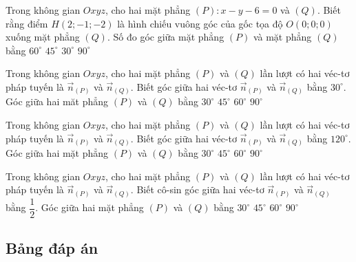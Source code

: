 \begin{ex}%
	Trong không gian $Oxyz$, cho hai mặt phẳng $(P)\colon x-y-6=0$ và $(Q)$. Biết rằng điểm $H(2;-1;-2)$ là hình chiếu vuông góc của gốc tọa độ $O(0;0;0)$ xuống mặt phẳng $(Q)$. Số đo góc giữa mặt phẳng $(P)$ và mặt phẳng $(Q)$ bằng
	\choice
	{$60^{\circ}$}
	{\True $45^{\circ}$}
	{$30^{\circ}$}
	{$90^{\circ}$}
\end{ex}

\begin{ex}%
	Trong không gian $Oxyz$, cho hai mặt phẳng $(P)$ và $(Q)$ lần lượt có hai véc-tơ pháp tuyến là $\overrightarrow{n}_{(P)}$ và $\overrightarrow{n}_{(Q)}$. Biết góc giữa hai véc-tơ $\overrightarrow{n}_{(P)}$ và $\overrightarrow{n}_{(Q)}$ bằng $30^{\circ}$. Góc giữa hai măt phẳng $(P)$ và $(Q)$ bằng
	\choice
	{\True $30^{\circ}$}
	{$45^{\circ}$}
	{$60^{\circ}$}
	{$90^{\circ}$}
\end{ex}

\begin{ex}%
	Trong không gian $Oxyz$, cho hai mặt phẳng $(P)$ và $(Q)$ lần lượt có hai véc-tơ pháp tuyến là $\overrightarrow{n}_{(P)}$ và $\overrightarrow{n}_{(Q)}$. Biết góc giữa hai véc-tơ $\overrightarrow{n}_{(P)}$ và $\overrightarrow{n}_{(Q)}$ bằng $120^{\circ}$. Góc giữa hai mặt phẳng $(P)$ và $(Q)$ bằng
	\choice
	{$30^{\circ}$}
	{$45^{\circ}$}
	{\True $60^{\circ}$}
	{$90^{\circ}$}
\end{ex}

\begin{ex}%
	Trong không gian $Oxyz$, cho hai mặt phẳng $(P)$ và $(Q)$ lần lượt có hai véc-tơ pháp tuyến là $\overrightarrow{n}_{(P)}$ và $\overrightarrow{n}_{(Q)}$. Biết cô-sin góc giữa hai véc-tơ $\overrightarrow{n}_{(P)}$ và $\overrightarrow{n}_{(Q)}$ bằng $\dfrac{1}{2}$. Góc giữa hai mặt phẳng $(P)$ và $(Q)$ bằng
	\choice
	{$30^{\circ}$}
	{$45^{\circ}$}
	{\True $60^{\circ}$}
	{$90^{\circ}$}
\end{ex}

\subsection{Bảng đáp án}

